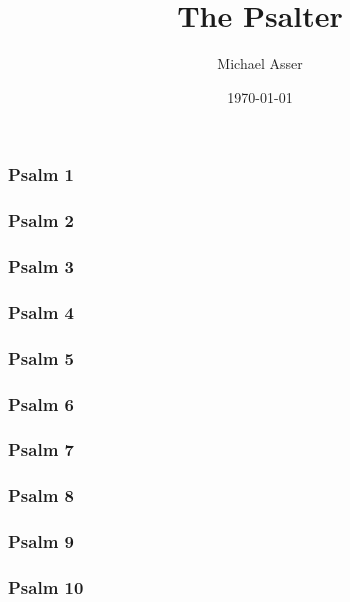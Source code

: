 \documentclass[12pt]{extarticle}
\title{The Psalter}
\author{Michael Asser}
\date{\today}
\begin{document}
\begin{multicols}{2}

\subsubsection{Psalm 1}

\newpage

\subsubsection{Psalm 2}

\newpage

\subsubsection{Psalm 3}

\newpage

\subsubsection{Psalm 4}

\newpage

\subsubsection{Psalm 5}

\newpage

\subsubsection{Psalm 6}

\newpage

\subsubsection{Psalm 7}

\newpage

\subsubsection{Psalm 8}

\newpage

\subsubsection{Psalm 9}

\newpage

\subsubsection{Psalm 10}

\newpage


\end{multicols}
\end{document}
